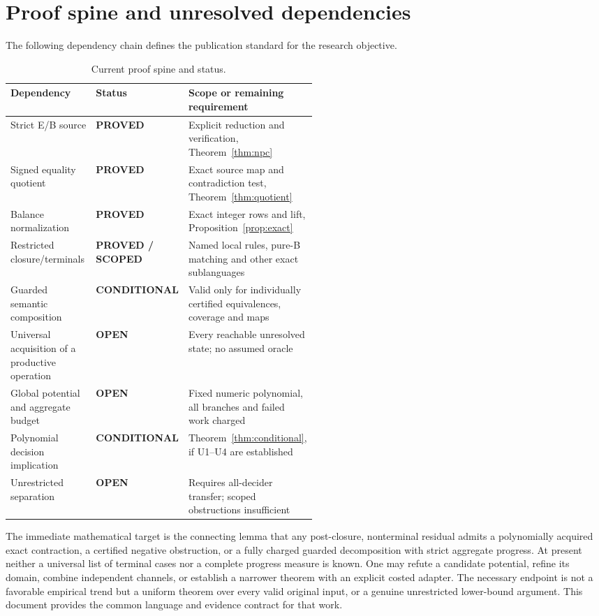 \documentclass[11pt,letterpaper]{article}
\theoremstyle{definition}
\newcommand{\status}[1]{\textsf{\small\textbf{#1}}}
\begin{document}
\section{Proof spine and unresolved dependencies}\label{sec:spine}
The following dependency chain defines the publication standard for the research objective.
\begin{table}[htbp]
\centering\small
\caption{Current proof spine and status.}\label{tab:status}
\begin{tabularx}{\linewidth}{@{}L{0.30\linewidth}L{0.21\linewidth}Y@{}}
\toprule
Dependency & Status & Scope or remaining requirement \\
\midrule
Strict E/B source & \status{PROVED} & Explicit reduction and verification, Theorem~\ref{thm:npc} \\
Signed equality quotient & \status{PROVED} & Exact source map and contradiction test, Theorem~\ref{thm:quotient} \\
Balance normalization & \status{PROVED} & Exact integer rows and lift, Proposition~\ref{prop:exact} \\
Restricted closure/terminals & \status{PROVED / SCOPED} & Named local rules, pure-B matching and other exact sublanguages \\
Guarded semantic composition & \status{CONDITIONAL} & Valid only for individually certified equivalences, coverage and maps \\
Universal acquisition of a productive operation & \status{OPEN} & Every reachable unresolved state; no assumed oracle \\
Global potential and aggregate budget & \status{OPEN} & Fixed numeric polynomial, all branches and failed work charged \\
Polynomial decision implication & \status{CONDITIONAL} & Theorem~\ref{thm:conditional}, if U1--U4 are established \\
Unrestricted separation & \status{OPEN} & Requires all-decider transfer; scoped obstructions insufficient \\
\bottomrule
\end{tabularx}
\end{table}
The immediate mathematical target is the connecting lemma that any post-closure, nonterminal residual admits a polynomially acquired exact contraction, a certified negative obstruction, or a fully charged guarded decomposition with strict aggregate progress. At present neither a universal list of terminal cases nor a complete progress measure is known. One may refute a candidate potential, refine its domain, combine independent channels, or establish a narrower theorem with an explicit costed adapter. The necessary endpoint is not a favorable empirical trend but a uniform theorem over every valid original input, or a genuine unrestricted lower-bound argument. This document provides the common language and evidence contract for that work.
\end{document}
